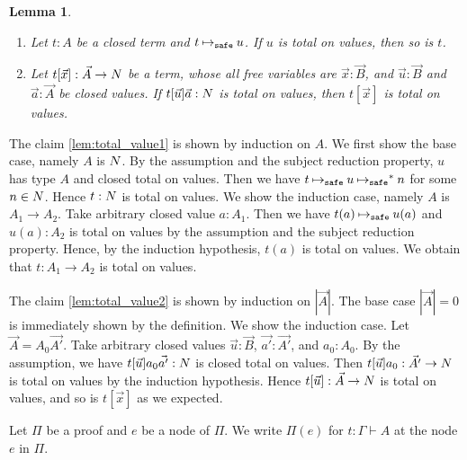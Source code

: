 \documentclass{article}
\newtheorem{lemma}[theorem]{Lemma}
\newenvironment{proof}[1][Proof]{\begin{trivlist}
\item[\hskip \labelsep {\bfseries #1}]}{\end{trivlist}}
\begin{document}
\begin{lemma}\label{lem:total_value}
  \begin{enumerate}
  \item\label{lem:total_value1}
    Let $t:A$ be a closed term and $t \mathbin{{\mapsto}_{\tiny \tt safe}} u$.
    If $u$ is total on values, then so is $t$.
  \item\label{lem:total_value2}
    Let $t[\vec{x}]:\vec{A}\rightarrow{N}$ be a term,
    whose all free variables are $\vec{x}:\vec{B}$,
    and $\vec{u}:\vec{B}$ and $\vec{a}:\vec{A}$ be closed values.
    If $t[\vec{u}]\vec{a}:{N}$ is total on values, then $t[\vec{x}]$ is total on values. 
  \end{enumerate}
\end{lemma}
\begin{proof}
  The claim \ref{lem:total_value1} is shown by induction on $A$. 
  We first show the base case, namely $A$ is ${N}$.
  By the assumption and the subject reduction property, $u$ has type $A$ and closed total on values.
  Then we have $t \mathbin{{\mapsto}_{\tiny \tt safe}} u \mathbin{{\mapsto}_{\tiny \tt safe}}^* n$ for some $n\in{N}$. 
  Hence $t:{N}$ is total on values.
  We show the induction case, namely $A$ is $A_1\rightarrow A_2$.
  Take arbitrary closed value $a:A_1$. Then we have $t(a) \mathbin{{\mapsto}_{\tiny \tt safe}} u(a)$ and 
  $u(a):A_2$ is total on values by the assumption and the subject reduction property.
  Hence, by the induction hypothesis, $t(a)$ is total on values. 
  We obtain that $t:A_1\rightarrow A_2$ is total on values. 
  
  The claim \ref{lem:total_value2} is shown by induction on $|\vec{A}|$.
  The base case $|\vec{A}| = 0$ is immediately shown by the definition.
  We show the induction case. Let $\vec{A} = A_0\vec{A'}$.
  Take arbitrary closed values $\vec{u}:\vec{B}$, $\vec{a'}:\vec{A'}$, and $a_0:A_0$. 
  By the assumption, we have $t[\vec{u}]a_0\vec{a'}:{N}$ is closed total on values. 
  Then $t[\vec{u}]a_0:\vec{A'}\rightarrow{N}$ is total on values by the induction hypothesis.
  Hence $t[\vec{u}]:\vec{A}\rightarrow{N}$ is total on values,
  and so is $t[\vec{x}]$ as we expected.
\end{proof}

Let $\Pi$ be a proof and $e$ be a node of $\Pi$.
We write $\Pi(e)$ for $t:\Gamma\vdash A$ at the node $e$ in $\Pi$. 
\end{document}
